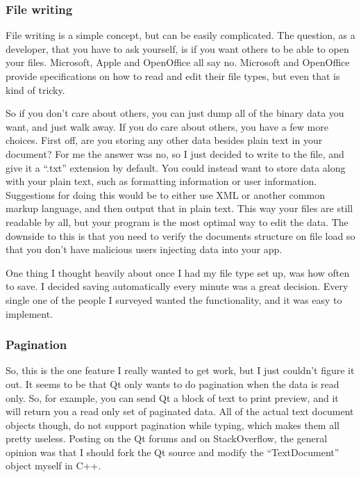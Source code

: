 \documentclass[10pt]{article}
\begin{document}
\subsubsection{File writing}

File writing is a simple concept, but can be easily complicated. The question, as a developer, that you have to ask yourself, is if you want others to be able to open your files. Microsoft, Apple and OpenOffice all say no. Microsoft and OpenOffice provide specifications on how to read and edit their file types, but even that is kind of tricky.

So if you don't care about others, you can just dump all of the binary data you want, and just walk away. If you do care about others, you have a few more choices. First off, are you storing any other data besides plain text in your document? For me the answer was no, so I just decided to write to the file, and give it a ``.txt'' extension by default. You could instead want to store data along with your plain text, such as formatting information or user information. Suggestions for doing this would be to either use XML or another common markup language, and then output that in plain text. This way your files are still readable by all, but your program is the most optimal way to edit the data. The downside to this is that you need to verify the documents structure on file load so that you don't have malicious users injecting data into your app.

One thing I thought heavily about once I had my file type set up, was how often to save. I decided saving automatically every minute was a great decision. Every single one of the people I surveyed wanted the functionality, and it was easy to implement.

\subsubsection{Pagination}

So, this is the one feature I really wanted to get work, but I just couldn't figure it out. It seems to be that Qt only wants to do pagination when the data is read only. So, for example, you can send Qt a block of text to print preview, and it will return you a read only set of paginated data. All of the actual text document objects though, do not support pagination while typing, which makes them all pretty useless. Posting on the Qt forums and on StackOverflow, the general opinion was that I should fork the Qt source and modify the ``TextDocument'' object myself in C++.
\end{document}
